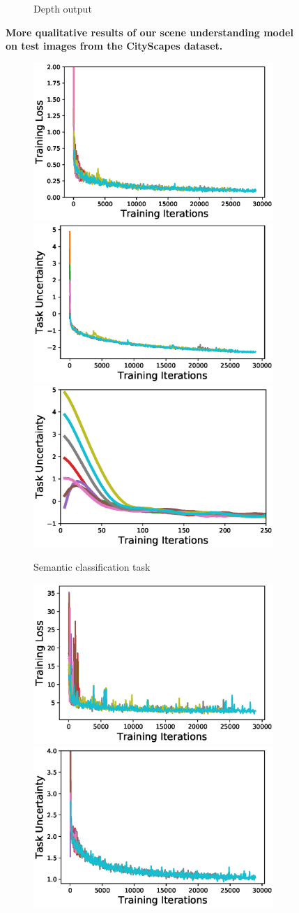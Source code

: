 \begin{figure}[p]
{{\begin{subfigure}[t]{0.24\linewidth}
\begin{center}
  \caption{Depth output}
\end{center}
\end{subfigure}}}
	\caption[Further qualitative results on the CityScapes dataset.]{\textbf{More qualitative results of our scene understanding model on test images from the CityScapes dataset.}}
	\label{fig:cityscapesquallarge}
\end{figure}

\begin{figure}[p]
\begin{subfigure}[t]{\linewidth}
\begin{center}
  \includegraphics[width=0.32\linewidth]{plots/class_loss.eps}
  \includegraphics[width=0.32\linewidth]{plots/class_weight.eps}
  \includegraphics[width=0.32\linewidth]{plots/class_weight_zoom.eps}
  \caption{Semantic classification task}
\end{center}
\end{subfigure}
\begin{subfigure}[t]{\linewidth}
\begin{center}
  \includegraphics[width=0.32\linewidth]{plots/instance_loss.eps}
  \includegraphics[width=0.32\linewidth]{plots/instance_weight.eps}

\end{center}
\end{subfigure}
\end{figure}
